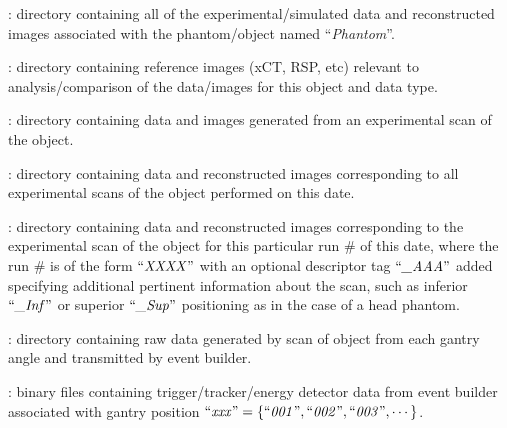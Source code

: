 \documentclass[landscape,12pt]{article}
\begin{document}
    \begin{myEnumerate}[labelindent=1pt, leftmargin=*]
        \item {} \color{Black}: directory containing all of the experimental/simulated data and reconstructed images associated with the phantom/object named ``\textit{Phantom}''.
        \begin{myEnumerate}[labelindent=1pt, leftmargin=*]
            \item {} \color{Black}: directory containing reference images (xCT, RSP, etc) relevant to analysis/comparison of the data/images for this object and data type.
            \item {} \color{Black}: directory containing data and images generated from an experimental scan of the object.
            \begin{myEnumerate}[labelindent=1pt, leftmargin=*]
                \item {} \color{Black}: directory containing data and reconstructed images corresponding to all experimental scans of the object performed on this date.
                \begin{myEnumerate}[labelindent=1pt, leftmargin=*]
                    \item {} \color{Black}: directory containing data and reconstructed images corresponding to the experimental scan of the object for this particular run \# of this date, where the run \# is of the form $\textrm{``\textit{XXXX}''}$ with an optional descriptor tag $\textrm{``\textit{\_AAA}''}$ added specifying additional pertinent information about the scan, such as inferior $\textrm{``\textit{\_Inf}''}$ or superior $\textrm{``\textit{\_Sup}''}$ positioning as in the case of a head phantom.
                    \begin{myEnumerate}[labelindent=1pt, leftmargin=*]
                        \item {} \color{Black}: directory containing raw data generated by scan of object from each gantry angle and transmitted by event builder.
                        \begin{myEnumerate}[labelindent=1pt, leftmargin=*]
                            \item {} \color{Black}: binary files containing trigger/tracker/energy detector data from event builder associated with gantry position $\textrm{``\textit{xxx}''} =\{\textrm{``\textit{001}''}, \textrm{``\textit{002}''}, \textrm{``\textit{003}''}, \cdots\}$.

\end{myEnumerate}
\end{myEnumerate}
\end{myEnumerate}
\end{myEnumerate}
\end{myEnumerate}
\end{myEnumerate}
\end{document}
